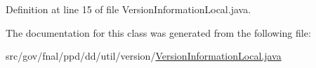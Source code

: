 Definition at line 15 of file Version\-Information\-Local.\-java.



The documentation for this class was generated from the following file\-:\begin{DoxyCompactItemize}
\item 
src/gov/fnal/ppd/dd/util/version/\hyperlink{VersionInformationLocal_8java}{Version\-Information\-Local.\-java}\end{DoxyCompactItemize}
